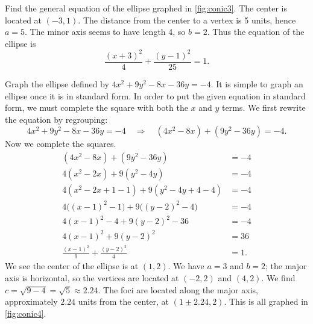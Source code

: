 \begin{example}\label{ex_conic3}%
Find the general equation of the ellipse graphed in \autoref{fig:conic3}.
%
\solution
The center is located at $(-3,1)$. The distance from the center to a vertex is 5 units, hence $a=5$. The minor axis seems to have length 4, so $b=2$. Thus the equation of the ellipse is
\[\frac{(x+3)^2}{4}+\frac{(y-1)^2}{25} = 1.\]
\end{example}

\begin{example}\label{ex_conic4}%
Graph the ellipse defined by $4x^2+9y^2-8x-36y=-4$.
\solution
It is simple to graph an ellipse once it is in standard form. In order to put the given equation in standard form, we must complete the square with both the $x$ and $y$ terms. We first rewrite the equation by regrouping:
\[4x^2+9y^2-8x-36y=-4 \quad \Rightarrow \quad (4x^2-8x) + (9y^2-36y) = -4.\]
Now we complete the squares.
\begin{align*}
	(4x^2-8x) + (9y^2-36y) &= -4\\
	4(x^2-2x) + 9(y^2-4y) &= -4 \\
	4(x^2-2x +1 - 1) + 9(y^2-4y+4-4) &= - 4\\
	4\bigl((x-1)^2-1\bigr) + 9\bigl((y-2)^2-4\bigr) &= -4\\
	4(x-1)^2 -4 + 9(y-2)^2-36 &= -4 \\
	4(x-1)^2 + 9(y-2)^2 &= 36 \\
	\frac{(x-1)^2}{9} + \frac{(y-2)^2}{4} &= 1.
\end{align*}
We see the center of the ellipse is at $(1,2)$. We have $a=3$ and $b=2$; the major axis is horizontal, so the vertices are located at $(-2,2)$ and $(4,2)$. We find $c=\sqrt{9-4} = \sqrt{5}\approx 2.24.$ The foci are located along the major axis, approximately $2.24$ units from the center, at $(1\pm 2.24,2)$. This is all graphed in \autoref{fig:conic4}.
\end{example}


